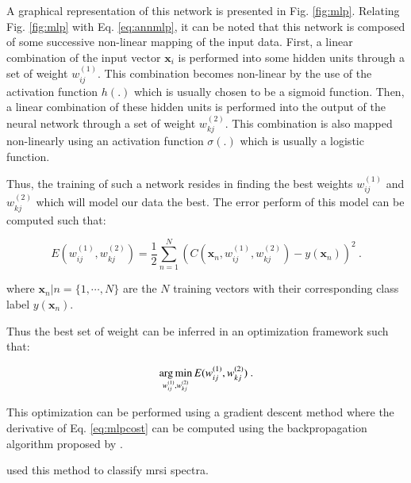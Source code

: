 \begin{enumerate}[leftmargin=*]
A graphical representation of this network is presented in Fig. \ref{fig:mlp}. Relating Fig. \ref{fig:mlp} with Eq. \ref{eq:annmlp}, it can be noted that this network is composed of some successive non-linear mapping of the input data. First, a linear combination of the input vector $\mathbf{x}_i$ is performed into some hidden units through a set of weight $w_{ij}^{(1)}$. This combination becomes non-linear by the use of the activation function $h(.)$ which is usually chosen to be a sigmoid function. Then, a linear combination of these hidden units is performed into the output of the neural network through a set of weight $w_{kj}^{(2)}$. This combination is also mapped non-linearly using an activation function $\sigma(.)$ which is usually a logistic function.

Thus, the training of such a network resides in finding the best weights $w_{ij}^{(1)}$ and $ w_{kj}^{(2)}$ which will model our data the best. The error perform of this model can be computed such that:

\begin{equation}
	E(w_{ij}^{(1)},w_{kj}^{(2)}) = \frac{1}{2} \sum_{n=1}^{N} \left( C(\mathbf{x}_n,w_{ij}^{(1)},w_{kj}^{(2)}) - y(\mathbf{x}_n) \right) ^{2} \ .
	\label{eq:mlpcost}
\end{equation}

\noindent where $\mathbf{x}_n|n=\{1,\cdots,N\}$ are the $N$ training vectors with their corresponding class label $y(\mathbf{x}_n)$.

Thus the best set of weight can be inferred in an optimization framework such that:

\begin{equation}
	\operatorname*{arg\,min}_{w_{ij}^{(1)},w_{kj}^{(2)}} E(w_{ij}^{(1)},w_{kj}^{(2)}) \ . 
	\label{eq:mlpopt}
\end{equation}

This optimization can be performed using a gradient descent method where the derivative of Eq. \ref{eq:mlpcost} can be computed using the backpropagation algorithm proposed by \cite{Rumelhart1988}.

\cite{Matulewicz2013,Parfait2012} used this method to classify \ac{mrsi} spectra.

\begin{figure}
\centering
\def\layersep{3cm}
\def\finallayersep{2.2cm}
\end{figure}
\end{enumerate}
